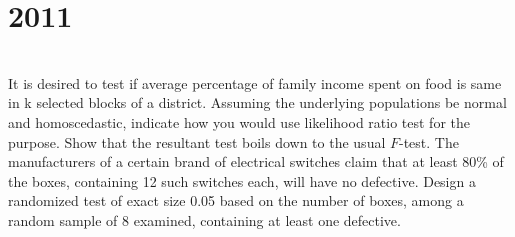 \section*{2011}
\vspace{-.5cm}
\hrulefill \smallskip\\
 It is desired to test if average percentage of family income spent on food is same in k selected blocks of a district. Assuming the underlying populations be normal and homoscedastic, indicate how you would use likelihood ratio test for the purpose. Show that the resultant test boils down to the usual $F$-test.
\myline
{} The manufacturers of a certain brand of electrical switches claim that at least 80\% of the boxes, containing 12 such switches each, will have no defective. Design a randomized test of exact size 0.05 based on the number of boxes, among a random sample of 8 examined, containing at least one defective. 